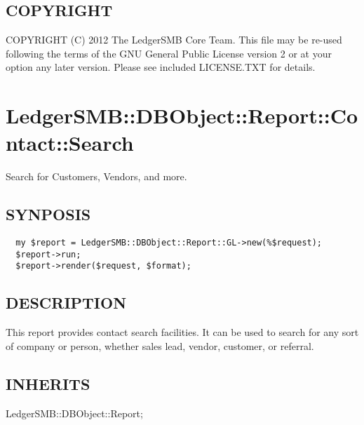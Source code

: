 \begin{description}
\begin{description}
\begin{description}
\begin{description}
\begin{description}
\begin{description}
\begin{description}
\begin{description}
\begin{description}
\begin{description}
\begin{description}
\end{description}
\subsection*{COPYRIGHT\label{LedgerSMB::DBObject::Report::COA_COPYRIGHT}}


COPYRIGHT (C) 2012 The LedgerSMB Core Team.  This file may be re-used following
the terms of the GNU General Public License version 2 or at your option any
later version.  Please see included LICENSE.TXT for details.

\section{LedgerSMB::DBObject::Report::Contact::Search\label{LedgerSMB::DBObject::Report::Contact::Search}}


Search for Customers, Vendors,
and more.

\subsection*{SYNPOSIS\label{LedgerSMB::DBObject::Report::Contact::Search_SYNPOSIS}}
\begin{verbatim}
  my $report = LedgerSMB::DBObject::Report::GL->new(%$request);
  $report->run;
  $report->render($request, $format);
\end{verbatim}
\subsection*{DESCRIPTION\label{LedgerSMB::DBObject::Report::Contact::Search_DESCRIPTION}}


This report provides contact search facilities.  It can be used to search for
any sort of company or person, whether sales lead, vendor, customer, or
referral.

\subsection*{INHERITS\label{LedgerSMB::DBObject::Report::Contact::Search_INHERITS}}
\begin{description}

\item[{LedgerSMB::DBObject::Report;}] \mbox{}\end{description}

\end{description}
\end{description}
\end{description}
\end{description}
\end{description}
\end{description}
\end{description}
\end{description}
\end{description}
\end{description}
